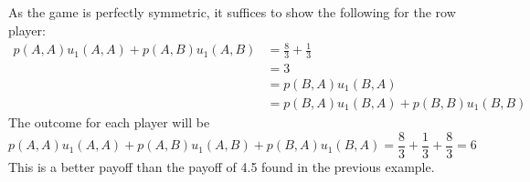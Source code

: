 \documentclass[]{article}
\begin{document}
\subsection{}
As the game is perfectly symmetric, it suffices to show the following for the row player:
\begin{align*}
p(A,A)u_1(A,A) + p(A,B)u_1(A,B) & = \frac{8}{3}+ \frac{1}{3} \\ &= 3\\ &=   p(B,A)u_1(B,A) \\ &= p(B,A)u_1(B,A) + p(B,B)u_1(B,B) 
\end{align*}                                  
The outcome for each player will be
\[p(A,A)u_1(A,A)+p(A,B)u_1(A,B)+p(B,A)u_1(B,A) = \frac{8}{3}+\frac{1}{3}+\frac{8}{3} = 6\]
This is a better payoff than the payoff of 4.5 found in the previous example.
\end{document}
